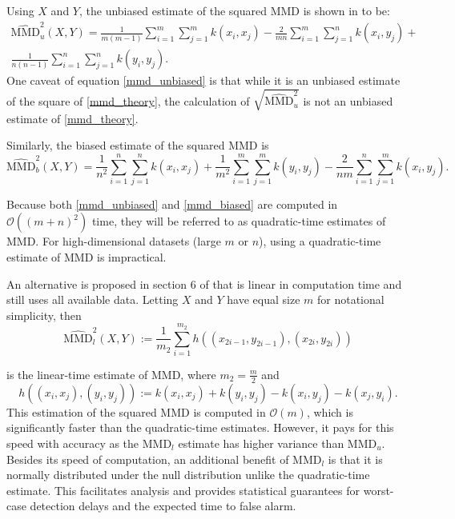 Using $X$ and $Y$, the unbiased estimate of the squared MMD is shown in \cite{gretton2012kernel} to be:
\begin{equation}
\label{mmd_unbiased}
\begin{split}
\widehat{\text{MMD}}_{u}^{2}(X, Y)=\frac{1}{m(m-1)} \sum_{i=1}^m \sum_{ j=1}^{m} k\left(x_{i}, x_{j}\right)-\frac{2}{m n} \sum_{i=1}^m \sum_{ j=1}^{n} k\left(x_{i}, y_{j}\right)+ \\
\frac{1}{n(n-1)} \sum_{i=1}^n \sum_{j=1}^{n} k\left(y_{i}, y_{j}\right).
\end{split}
\end{equation}
One caveat of equation \ref{mmd_unbiased} is that while it is an unbiased estimate of the square of \ref{mmd_theory}, the calculation of $\sqrt{\widehat{\text{MMD}}_{u}^{2}}$ is not an unbiased estimate of \ref{mmd_theory}.

Similarly, the biased estimate of the squared MMD is
\begin{equation}
\label{mmd_biased}
\widehat{\text{MMD}}_{b}^{2}(X, Y)= \frac{1}{n^{2}} \sum_{i=1}^{n} \sum_{j=1}^{n} k\left(x_{i}, x_{j}\right)+\frac{1}{m^{2}} \sum_{i=1}^{m} \sum_{j=1}^{m} k\left(y_{i}, y_{j}\right)-\frac{2}{n m} \sum_{i=1}^{n} \sum_{j=1}^{m} k\left(x_{i}, y_{j}\right).
\end{equation}

Because both \ref{mmd_unbiased} and \ref{mmd_biased} are computed in $\mathcal{O}((m + n)^2)$ time, they will be referred to as quadratic-time estimates of MMD. For high-dimensional datasets (large $m$ or $n$), using a quadratic-time estimate of MMD is impractical.  

An alternative is proposed in section 6 of \cite{gretton2012kernel} that is linear in computation time and still uses all available data. Letting $X$ and $Y$ have equal size $m$ for notational simplicity, then
\begin{equation}
\label{mmd_linear}
\widehat{\text{MMD}}_{l}^{2}(X, Y) :=\frac{1}{m_{2}} \sum_{i=1}^{m_{2}} h\left(\left(x_{2 i-1}, y_{2 i-1}\right),\left(x_{2 i}, y_{2 i}\right)\right)
\end{equation}

is the linear-time estimate of MMD, where $m_2=\frac{m}{2}$ and
\begin{equation}
h\left((x_i, x_j), (y_i, y_j)\right):=k\left(x_{i}, x_{j}\right)+k\left(y_{i}, y_{j}\right)-k\left(x_{i}, y_{j}\right)-k\left(x_{j}, y_{i}\right).
\end{equation}
This estimation of the squared MMD is computed in $\mathcal{O}(m)$, which is significantly faster than the quadratic-time estimates. However, it pays for this speed with accuracy as the MMD$_l$ estimate has higher variance than MMD$_u$. Besides its speed of computation, an additional benefit of MMD$_l$ is that it is normally distributed under the null distribution unlike the quadratic-time estimate. This facilitates analysis and provides statistical guarantees for worst-case detection delays and the expected time to false alarm. 

